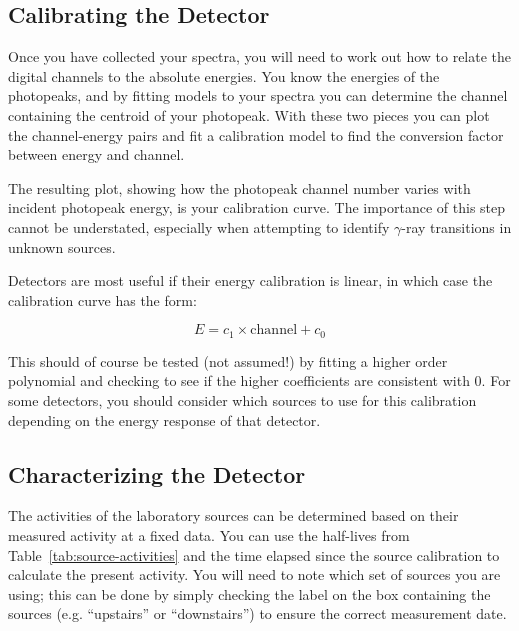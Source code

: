\documentclass{tufte-book}
\newcommand{\textgamma}{\ensuremath{\gamma}} %
\begin{document}
\subsection{Calibrating the Detector}
\label{subsec:he-calib}

Once you have collected your spectra, you will need to work out how to relate the digital channels to the absolute energies. You know the energies of the photopeaks, and by fitting models to your spectra you can determine the channel containing the centroid of your photopeak. With these two pieces you can plot the channel-energy pairs and fit a calibration model to find the conversion factor between energy and channel.

The resulting plot, showing how the photopeak channel number varies with incident photopeak energy, is your calibration curve. The importance of this step cannot be understated, especially when attempting to identify \textgamma-ray transitions in unknown sources.

Detectors are most useful if their energy calibration is linear, in which case the calibration curve has the form:

\begin{equation}
    E = c_1 \times \mathrm{channel} + c_0
\end{equation}

\noindent This should of course be tested (not assumed!) by fitting a higher order polynomial and checking to see if the higher coefficients are consistent with 0. For some detectors, you should consider which sources to use for this calibration depending on the energy response of that detector.

\subsection{Characterizing the Detector}
\label{subsec:he-character}

The activities of the laboratory sources can be determined based on their measured activity at a fixed data. You can use the half-lives from Table~\ref{tab:source-activities} and the time elapsed since the source calibration to calculate the present activity. You will need to note which set of sources you are using; this can be done by simply checking the label on the box containing the sources (e.g. ``upstairs'' or ``downstairs'') to ensure the correct measurement date.

\end{document}
